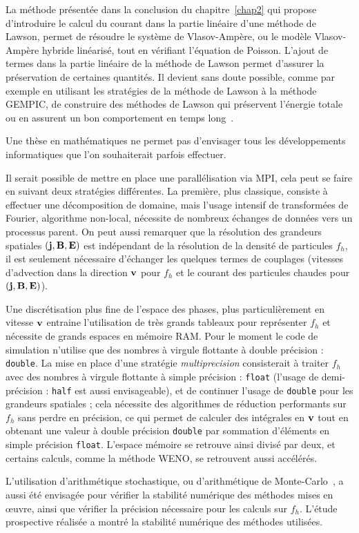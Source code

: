 La méthode présentée dans la conclusion du chapitre~\ref{chap2} qui propose d'introduire le calcul du courant dans la partie linéaire d'une méthode de Lawson, permet de résoudre le système de Vlasov-Ampère, ou le modèle Vlasov-Ampère hybride linéarisé, tout en vérifiant l'équation de Poisson. L'ajout de termes dans la partie linéaire de la méthode de Lawson permet d'assurer la préservation de certaines quantités. Il devient sans doute possible, comme par exemple en utilisant les stratégies de la méthode de Lawson à la méthode GEMPIC, de construire des méthodes de Lawson qui préservent l'énergie totale ou en assurent un bon comportement en temps long~\cite{Kormann:2021}.


Une thèse en mathématiques ne permet pas d'envisager tous les développements informatiques que l'on souhaiterait parfois effectuer.

Il serait possible de mettre en place une parallélisation via MPI, cela peut se faire en suivant deux stratégies différentes. La première, plus classique, consiste à effectuer une décomposition de domaine, mais l'usage intensif de transformées de Fourier, algorithme non-local, nécessite de nombreux échanges de données vers un processus parent. On peut aussi remarquer que la résolution des grandeurs spatiales $(\vb{j},\vb{B},\vb{E})$ est indépendant de la résolution de la densité de particules $f_h$, il est seulement nécessaire d'échanger les quelques termes de couplages (vitesses d'advection dans la direction $\vb{v}$ pour $f_h$ et le courant des particules chaudes pour $(\vb{j},\vb{B},\vb{E})$).

Une discrétisation plus fine de l'espace des phases, plus particulièrement en vitesse $\vb{v}$ entraine l'utilisation de très grands tableaux pour représenter $f_h$ et nécessite de grands espaces en mémoire RAM. Pour le moment le code de simulation n'utilise que des nombres à virgule flottante à double précision : \texttt{double}. La mise en place d'une stratégie \emph{multiprecision} consisterait à traiter $f_h$ avec des nombres à virgule flottante à simple précision : \texttt{float} (l'usage de demi-précision : \texttt{half} est aussi envisageable), et de continuer l'usage de \texttt{double} pour les grandeurs spatiales ; cela nécessite des algorithmes de réduction performants sur $f_h$ sans perdre en précision, ce qui permet de calculer des intégrales en $\vb{v}$ tout en obtenant une valeur à double précision \texttt{double} par sommation d'éléments en simple précision \texttt{float}. L'espace mémoire se retrouve ainsi divisé par deux, et certains calculs, comme la méthode WENO, se retrouvent aussi accélérés.

L'utilisation d'arithmétique stochastique, ou d'arithmétique de Monte-Carlo~\cite{Parker:1997,Parker:1997a}, a aussi été envisagée pour vérifier la stabilité numérique des méthodes mises en œuvre, ainsi que vérifier la précision nécessaire pour les calculs sur $f_h$. L'étude prospective réalisée a montré la stabilité numérique des méthodes utilisées.
